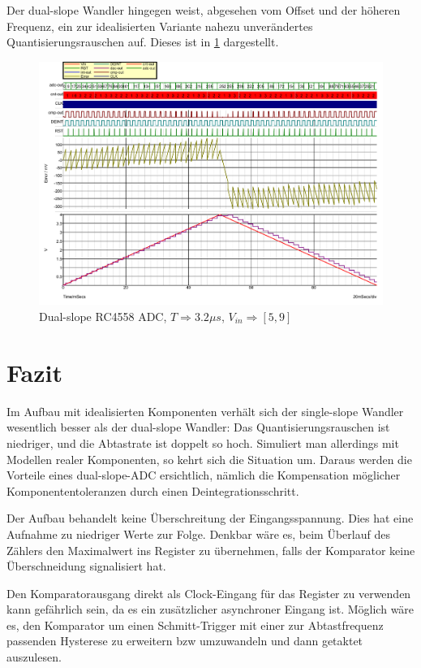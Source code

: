 \documentclass[
	ngerman,
	parskip=half,
	twocolumn,
	DIV=calc,
	]{scrartcl}
\begin{document}
		Der dual-slope Wandler hingegen weist, abgesehen vom Offset und der höheren Frequenz, ein zur idealisierten Variante nahezu unverändertes Quantisierungsrauschen auf. Dieses ist in \cref{fig:dual-slope-RC4558} dargestellt.
	
		\begin{figure}
			\centering
			\includegraphics[width=\linewidth]{RC4558_dual_slope}			
			\caption[Dual-slope RC4558 ADC]{Dual-slope RC4558 ADC, $T \Rightarrow 3.2\mu s$, $V_{in} \Rightarrow [5,  9]$}			
			\label{fig:dual-slope-RC4558}
		\end{figure}
	\section{Fazit}	
		Im Aufbau mit idealisierten Komponenten verhält sich der single-slope Wandler wesentlich besser als der dual-slope Wandler: Das Quantisierungsrauschen  ist niedriger, und die Abtastrate ist doppelt so hoch. Simuliert man allerdings mit Modellen realer Komponenten, so kehrt sich die Situation um. Daraus werden die Vorteile eines dual-slope-ADC ersichtlich, nämlich die Kompensation möglicher Komponententoleranzen durch einen Deintegrationsschritt.
		
		Der Aufbau behandelt keine Überschreitung der Eingangsspannung.  Dies hat eine Aufnahme zu niedriger Werte zur Folge. Denkbar wäre es, beim Überlauf des Zählers den Maximalwert ins Register zu übernehmen, falls der Komparator keine Überschneidung signalisiert hat. 
		
		Den Komparatorausgang direkt als Clock-Eingang für das Register zu verwenden kann gefährlich sein, da es ein zusätzlicher asynchroner Eingang ist. Möglich wäre es, den Komparator um einen Schmitt-Trigger\cite{website:schmitt_trigger_slewrate} mit einer zur Abtastfrequenz passenden Hysterese zu erweitern bzw umzuwandeln und dann getaktet auszulesen.
		
\end{document}

